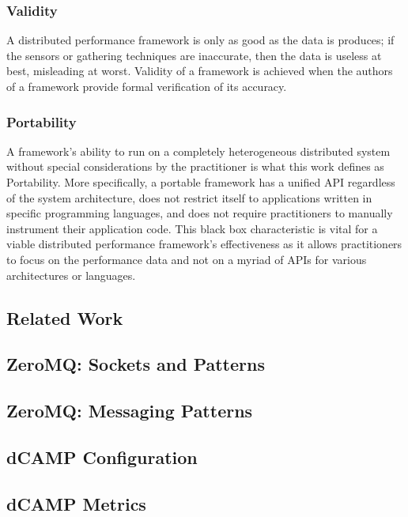\documentclass{beamer}
\begin{document}
\begin{frame}
\frametitle{Validity}
A distributed performance framework is only as good as the data is produces; if the sensors or gathering techniques are
inaccurate, then the data is useless at best, misleading at worst. Validity of a framework is achieved when the authors
of a framework provide formal verification of its accuracy.
\end{frame}

\begin{frame}
\frametitle{Portability}
A framework's ability to run on a completely heterogeneous distributed system without special considerations by the
practitioner is what this work defines as Portability. More specifically, a portable framework has a unified API
regardless of the system architecture, does not restrict itself to applications written in specific programming
languages, and does not require practitioners to manually instrument their application code. This black box
characteristic is vital for a viable distributed performance framework's effectiveness as it allows practitioners to
focus on the performance data and not on a myriad of APIs for various architectures or languages.
\end{frame}

\subsection{Related Work}

\subsection{ZeroMQ: Sockets and Patterns}

\subsection{ZeroMQ: Messaging Patterns}

\subsection{dCAMP Configuration}

\subsection{dCAMP Metrics}
\end{document}
